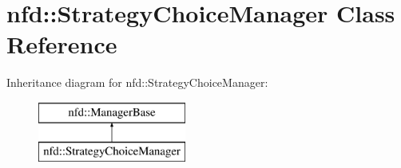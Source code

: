 \hypertarget{classnfd_1_1StrategyChoiceManager}{}\section{nfd\+:\+:Strategy\+Choice\+Manager Class Reference}
\label{classnfd_1_1StrategyChoiceManager}
Inheritance diagram for nfd\+:\+:Strategy\+Choice\+Manager\+:\begin{figure}[H]
\begin{center}
\leavevmode
\includegraphics[height=2.000000cm]{classnfd_1_1StrategyChoiceManager}
\end{center}
\end{figure}
